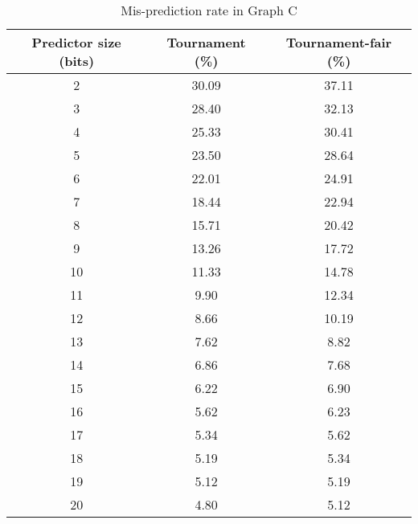 \documentclass[12pt,letterpaper]{article}
\begin{document}
\begin{table}
\caption{Mis-prediction rate in Graph C}
\centering
\begin{tabular}{|c|c|c|}
\hline 
Predictor size (bits) & Tournament (\%) & Tournament-fair (\%) \\ 
\hline 
2 & 30.09 & 37.11 \\ 
\hline 
3 & 28.40 & 32.13 \\ 
\hline 
4 & 25.33 & 30.41 \\ 
\hline 
5 & 23.50 & 28.64 \\ 
\hline 
6 & 22.01 & 24.91 \\ 
\hline 
7 & 18.44 & 22.94 \\ 
\hline 
8 & 15.71 & 20.42 \\ 
\hline 
9 & 13.26 & 17.72 \\ 
\hline 
10 & 11.33 & 14.78 \\ 
\hline 
11 & 9.90 & 12.34 \\ 
\hline 
12 & 8.66 & 10.19 \\ 
\hline 
13 & 7.62 & 8.82 \\ 
\hline 
14 & 6.86 & 7.68 \\ 
\hline 
15 & 6.22 & 6.90 \\ 
\hline 
16 & 5.62 & 6.23 \\ 
\hline 
17 & 5.34 & 5.62 \\ 
\hline 
18 & 5.19 & 5.34 \\ 
\hline 
19 & 5.12 & 5.19 \\ 
\hline 
20 & 4.80 & 5.12 \\ 
\hline 
\end{tabular} 
\end{table}
\end{document}
